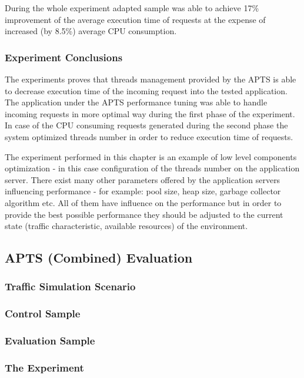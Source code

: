 \documentclass[10pt,a4paper]{article}
\begin{document}
During the whole experiment adapted sample was able to achieve 17\% improvement of the average execution time of requests at the expense of increased (by 8.5\%) average CPU consumption. 

\subsubsection{Experiment Conclusions} 

The experiments proves that threads management provided by the APTS is able to decrease execution time of the incoming request into the tested application. The application under the APTS performance tuning was able to handle incoming requests in more optimal way during the first phase of the experiment. In case of the CPU consuming requests generated during the second phase the system optimized threads number in order to reduce execution time of requests. 

The experiment performed in this chapter is an example of low level components optimization - in this case configuration of the threads number on the application server. There exist many other parameters offered by the application servers influencing performance - for example: pool size, heap size, garbage collector algorithm etc. All of them have influence on the performance but in order to provide the best possible performance they should be adjusted to the current state (traffic characteristic, available resources) of the environment. 


\subsection{APTS (Combined) Evaluation}
\subsubsection{Traffic Simulation Scenario} 
\subsubsection{Control Sample} 
\subsubsection{Evaluation Sample} 
\subsubsection{The Experiment} 
\end{document}
